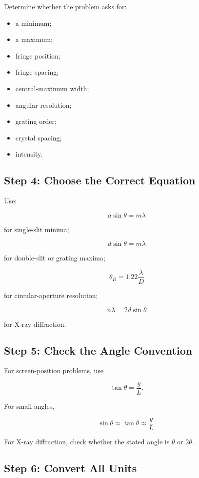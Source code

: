 \documentclass{studentnotes}
\begin{document}
Determine whether the problem asks for:

\begin{itemize}
    \item a minimum;
    \item a maximum;
    \item fringe position;
    \item fringe spacing;
    \item central-maximum width;
    \item angular resolution;
    \item grating order;
    \item crystal spacing;
    \item intensity.
\end{itemize}

\subsection{Step 4: Choose the Correct Equation}

Use:

\[
    a\sin\theta=m\lambda
\]

for single-slit minima;

\[
    d\sin\theta=m\lambda
\]

for double-slit or grating maxima;

\[
    \theta_R=1.22\frac{\lambda}{D}
\]

for circular-aperture resolution;

\[
    n\lambda=2d\sin\theta
\]

for X-ray diffraction.

\subsection{Step 5: Check the Angle Convention}

For screen-position problems, use

\[
    \tan\theta=\frac{y}{L}.
\]

For small angles,

\[
    \sin\theta\approx\tan\theta\approx\frac{y}{L}.
\]

For X-ray diffraction, check whether the stated angle is \(\theta\) or \(2\theta\).

\subsection{Step 6: Convert All Units}
\end{document}
